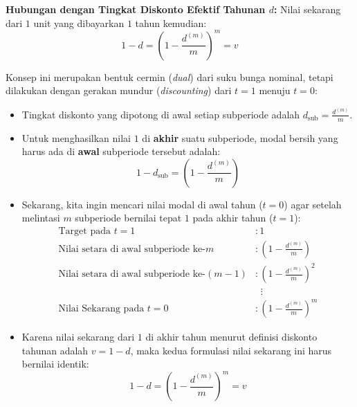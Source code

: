 \documentclass[11pt,a4paper]{article}
\begin{document}
\textbf{Hubungan dengan Tingkat Diskonto Efektif Tahunan $d$:}
Nilai sekarang dari $1$ unit yang dibayarkan $1$ tahun kemudian:
\begin{equation}
    1 - d = \left( 1 - \frac{d^{(m)}}{m} \right)^m = v
\end{equation}

\begin{notebox}
Konsep ini merupakan bentuk cermin (\emph{dual}) dari suku bunga nominal, tetapi dilakukan dengan gerakan mundur (\emph{discounting}) dari $t=1$ menuju $t=0$:
\begin{itemize}[leftmargin=1.5em]
    \item Tingkat diskonto yang dipotong di awal setiap subperiode adalah $d_{\text{sub}} = \frac{d^{(m)}}{m}$.
    \item Untuk menghasilkan nilai $1$ di \textbf{akhir} suatu subperiode, modal bersih yang harus ada di \textbf{awal} subperiode tersebut adalah:
    \begin{equation*}
        1 - d_{\text{sub}} = \left(1 - \frac{d^{(m)}}{m}\right)
    \end{equation*}
    \item Sekarang, kita ingin mencari nilai modal di awal tahun ($t = 0$) agar setelah melintasi $m$ subperiode bernilai tepat $1$ pada akhir tahun ($t = 1$):
    \begin{align*}
        \text{Target pada } t = 1 &: 1 \\
        \text{Nilai setara di awal subperiode ke-$m$} &: \left(1 - \tfrac{d^{(m)}}{m}\right) \\
        \text{Nilai setara di awal subperiode ke-$(m-1)$} &: \left(1 - \tfrac{d^{(m)}}{m}\right)^2 \\
        &\;\; \vdots \\
        \text{Nilai Sekarang pada } t = 0 &: \left(1 - \tfrac{d^{(m)}}{m}\right)^m
    \end{align*}
    \item Karena nilai sekarang dari $1$ di akhir tahun menurut definisi diskonto tahunan adalah $v = 1 - d$, maka kedua formulasi nilai sekarang ini harus bernilai identik:
    \begin{equation*}
        1 - d = \left(1 - \frac{d^{(m)}}{m}\right)^m = v
    \end{equation*}
\end{itemize}
\end{notebox}
\end{document}
